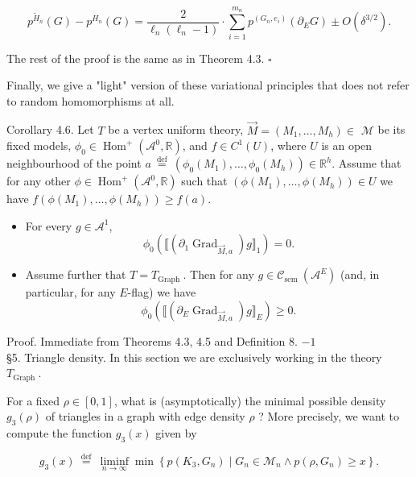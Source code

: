 \documentclass[10pt]{article}
\begin{document}
$$
p^{\widetilde{H}_{n}}(G)-p^{H_{n}}(G)=\frac{2}{\ell_{n}\left(\ell_{n}-1\right)} \cdot \sum_{i=1}^{m_{n}} p^{\left(G_{n}, e_{i}\right)}\left(\partial_{E} G\right) \pm O\left(\delta^{3 / 2}\right) .
$$

The rest of the proof is the same as in Theorem 4.3. \(\square\)

Finally, we give a "light" version of these variational principles that does not refer to random homomorphisms at all.

Corollary 4.6. Let $T$ be a vertex uniform theory, $\vec{M}=\left(M_{1}, \ldots, M_{h}\right) \in$ $\mathcal{M}$ be its fixed models, $\phi_{0} \in \operatorname{Hom}^{+}\left(\mathcal{A}^{0}, \mathbb{R}\right)$, and $f \in C^{1}(U)$, where $U$ is an open neighbourhood of the point $a \stackrel{\text { def }}{=}\left(\phi_{0}\left(M_{1}\right), \ldots, \phi_{0}\left(M_{h}\right)\right) \in \mathbb{R}^{h}$. Assume that for any other $\phi \in \operatorname{Hom}^{+}\left(\mathcal{A}^{0}, \mathbb{R}\right)$ such that $\left(\phi\left(M_{1}\right), \ldots, \phi\left(M_{h}\right)\right) \in U$ we have $f\left(\phi\left(M_{1}\right), \ldots, \phi\left(M_{h}\right)\right) \geq f(a)$.

\begin{itemize}
  \item[a)] For every $g \in \mathcal{A}^{1}$,
$$
\phi_{0}\left(\llbracket\left(\partial_{1} \operatorname{Grad}_{\vec{M}, a}\right) g \rrbracket_{1}\right)=0 .
$$
  \item[b)] Assume further that $T=T_{\text {Graph }}$. Then for any $g \in \mathcal{C}_{\text {sem }}\left(\mathcal{A}^{E}\right)$ (and, in particular, for any $E$-flag) we have
$$
\phi_{0}\left(\llbracket\left(\partial_{E} \operatorname{Grad}_{\vec{M}, a}\right) g \rrbracket_{E}\right) \geq 0 .
$$
\end{itemize}

Proof. Immediate from Theorems 4.3, 4.5 and Definition 8. $-1$\\
§5. Triangle density. In this section we are exclusively working in the theory $T_{\text {Graph }}$.

For a fixed $\rho \in[0,1]$, what is (asymptotically) the minimal possible density $g_{3}(\rho)$ of triangles in a graph with edge density $\rho$ ? More precisely, we want to compute the function $g_{3}(x)$ given by

$$
g_{3}(x) \stackrel{\text { def }}{=} \liminf _{n \rightarrow \infty} \min \left\{p\left(K_{3}, G_{n}\right) \mid G_{n} \in \mathcal{M}_{n} \wedge p\left(\rho, G_{n}\right) \geq x\right\} .
$$
\end{document}
